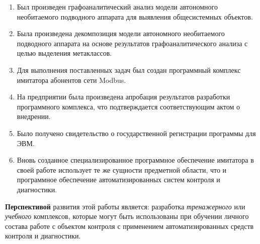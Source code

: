 \begin{enumerate}
  \item Был произведен графоаналитический анализ модели автономного необитаемого подводного аппарата для выявления
      общесистемных объектов.
  \item Была произведена декомпозиция модели автономного необитаемого подводного аппарата на основе результатов
      графоаналитического анализа с целью выделения метаклассов.
  \item Для выполнения поставленных задач был создан программный комплекс имитатора абонентов сети Modbus.
  \item На предприятии \leadingOrganizationTitle была произведена апробация результатов разработки программного комплекса,
      что подтверждается соответствующим актом о внедрении.
  \item Было получено свидетельство о государственной регистрации программы для ЭВМ.
  \item Вновь созданное специализированное программное обеспечение имитатора 
        в своей работе использует те же сущности предметной области, что и программное обеспечение 
        автоматизированных систем контроля и диагностики.
\end{enumerate}

\textbf{Перспективой} развития этой работы является:
разработка \textit{тренажерного} или \textit{учебного} комплексов, которые могут быть использованы при обучении
личного состава работе с объектом контроля с применением автоматизированных средств контроля и диагностики.
